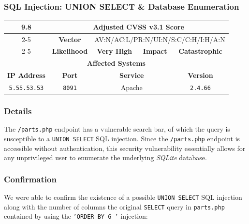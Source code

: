 \documentclass[12pt, letterpaper]{article}
\begin{document}
\clearpage
\subsubsection{SQL Injection: UNION SELECT \& Database Enumeration}

\begin{table}[!ht]
  \centering
  \renewcommand{\arraystretch}{1.8} %
  \begin{tabular}{|c|c|c|c|c|}
    \hline
    \multirow{3}{*}{\textcolor{RoyalPurple}{\textbf{\huge 9.8}}} &
    \multicolumn{4}{c|}{\textbf{Adjusted CVSS v3.1 Score}} \\ \cline{2-5}
    & \textbf{Vector} &
    \multicolumn{3}{c|}{AV:N/AC:L/PR:N/UI:N/S:C/C:H/I:H/A:N} \\ \cline{2-5}
    & \textbf{Likelihood} & \textcolor{RoyalPurple}{\textbf{Very High}}
    & \textbf{Impact} & \textcolor{RoyalPurple}{\textbf{Catastrophic}} \\ \hline
    \multicolumn{5}{|c|}{\textbf{Affected Systems}} \\ \hline
    \textbf{IP Address} & \textbf{Port} &
    \multicolumn{2}{c|}{\textbf{Service}} & \textbf{Version} \\ \hline
    \texttt{5.55.53.53} & \texttt{8091} & \multicolumn{2}{c|}{Apache}
    & \texttt{2.4.66} \\ \hline
  \end{tabular}
\end{table}
\FloatBarrier

\subsubsection*{Details}

The \texttt{/parts.php} endpoint has a vulnerable search bar, of
which the query is susceptible to a \texttt{UNION SELECT} SQL
injection. Since the \texttt{/parts.php} endpoint is accessible
without authentication, this security vulnerability essentially
allows for any unprivileged user to enumerate the underlying
\textit{SQLite} database.

\subsubsection*{Confirmation}

We were able to confirm the existence of a possible \texttt{UNION
SELECT} SQL injection along with the number of columns the original
\texttt{SELECT} query in \texttt{parts.php} contained by using the
\texttt{'ORDER BY 6--'} injection:
\end{document}
